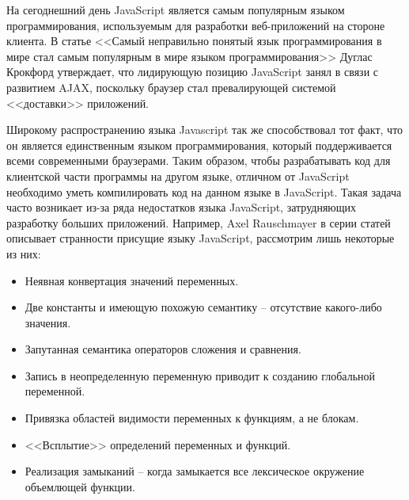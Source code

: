 \startprefacepage


На сегоднешний день JavaScript является самым популярным языком программирования, используемым для разработки веб-приложений на стороне клиента\cite{JsUsage, LangUsage}. В статье <<Самый неправильно понятый язык программирования в мире стал самым популярным в мире языком программирования>>\cite{MostPopLang} Дуглас Крокфорд утверждает, что лидирующую позицию JavaScript занял в связи с развитием AJAX\cite{AJAX}, поскольку браузер стал превалирующей системой <<доставки>> приложений. %

Широкому распространению языка Javascript так же способствовал тот факт, что он является единственным языком программирования, который поддерживается всеми современными браузерами. Таким образом, чтобы разрабатывать код для клиентской части программы на другом языке, отличном от JavaScript необходимо уметь компилировать код на данном языке  в JavaScript. Такая задача часто возникает из-за ряда недостатков языка JavaScript, затрудняющих разработку больших приложений.
Например, Axel Rauschmayer в серии статей описывает странности присущие языку JavaScript\cite{JsQuirks}, рассмотрим лишь некоторые из них:
\begin{itemize}
\item Неявная конвертация значений переменных.
\item Две константы  и  имеющую похожую семантику -- отсутствие какого-либо значения. 
\item Запутанная семантика операторов сложения и сравнения.
\item Запись в неопределенную переменную приводит к созданию глобальной переменной.
\item Привязка областей видимости переменных к функциям, а не блокам.
 \item <<Всплытие>> определений переменных и функций.
\item Реализация замыканий -- когда замыкается все лексическое окружение объемлющей функции.
\end{itemize}
%

